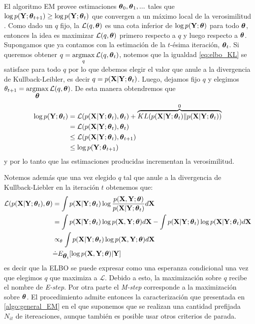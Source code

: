 El algoritmo EM provee estimaciones $\mbox{\boldmath$ \theta $}_0, \mbox{\boldmath$ \theta $}_1, ...$ tales que $\log p(\mathbf{Y}; \mbox{\boldmath$ \theta $}_{t+1}) \geq \log p(\mathbf{Y}; \mbox{\boldmath$ \theta $}_t)$ que convergen a un máximo local de la verosimilitud \citep{Wu1983}. Como dado un $q$ fijo, la $\mathcal{L}(q,\mbox{\boldmath$ \theta $})$ es una cota inferior de $\log p(\mathbf{Y}; \mbox{\boldmath$ \theta $})$ para todo $\mbox{\boldmath$ \theta $}$, entonces la idea es maximizar $\mathcal{L}(q,\mbox{\boldmath$ \theta $})$ primero respecto a $q$ y luego respecto a $\mbox{\boldmath$ \theta $}$. Supongamos que ya contamos con la estimación de la $t$-ésima iteración, $\mbox{\boldmath$ \theta $}_t$. Si queremos obtener $q = \operatorname*{argmax}\limits_{q}\mathcal{L}(q,\mbox{\boldmath$ \theta $}_t)$, notemos que la igualdad \ref{eq:elbo_KL} se satisface para todo $q$ por lo que debemos elegir el valor que anule a la divergencia de Kullback-Leibler, es decir $q = p(\mathbf{X} | \mathbf{Y}; \mbox{\boldmath$ \theta $}_t)$. Luego, dejamos fijo $q$ y elegimos $\theta_{t+1} = \operatorname*{argmax}\limits_{\mbox{\boldmath$ \theta $}} \mathcal{L}(q,\mbox{\boldmath$ \theta $})$. De esta manera obtendremos que 
\begin{align*}
    \log p(\mathbf{Y}; \mbox{\boldmath$ \theta $}_t) &= \mathcal{L}(p(\mathbf{X} | \mathbf{Y}; \mbox{\boldmath$ \theta $}_t), \mbox{\boldmath$ \theta $}_t) + \overbrace{KL(p(\mathbf{X} | \mathbf{Y}; \mbox{\boldmath$ \theta $}_t) \rVert p(\mathbf{X} | \mathbf{Y}; \mbox{\boldmath$ \theta $}_t))}^{0} \\
    &= \mathcal{L}(p(\mathbf{X} | \mathbf{Y}; \mbox{\boldmath$ \theta $}_t), \mbox{\boldmath$ \theta $}_t) \\
    &\leq \mathcal{L}(p(\mathbf{X} | \mathbf{Y}; \mbox{\boldmath$ \theta $}_t), \mbox{\boldmath$ \theta $}_{t+1}) \\
    &\leq \log p(\mathbf{Y}; \mbox{\boldmath$ \theta $}_{t+1})
\end{align*}
y por lo tanto que las estimaciones producidas incrementan la verosimilitud.

Notemos además que una vez elegido $q$ tal que anule a la divergencia de Kullback-Liebler en la iteración $t$ obtenemos que:
\begin{align*}
    \mathcal{L}(p(\mathbf{X} | \mathbf{Y}; \mbox{\boldmath$ \theta $}_t), \mbox{\boldmath$ \theta $}) &= \int p(\mathbf{X} | \mathbf{Y}; \mbox{\boldmath$ \theta $}_t) \log \frac{p(\mathbf{X}, \mathbf{Y}; \mbox{\boldmath$ \theta $})}{p(\mathbf{X} | \mathbf{Y}; \mbox{\boldmath$ \theta $}_t)} d\mathbf{X} \\
    &= \int p(\mathbf{X} | \mathbf{Y}; \mbox{\boldmath$ \theta $}_t) \log p(\mathbf{X}, \mathbf{Y}; \mbox{\boldmath$ \theta $}) d\mathbf{X} - \int p(\mathbf{X} | \mathbf{Y}; \mbox{\boldmath$ \theta $}_t) \log p(\mathbf{X} | \mathbf{Y}; \mbox{\boldmath$ \theta $}_t) d\mathbf{X} \\
    &\propto_{\theta} \int p(\mathbf{X} | \mathbf{Y}; \mbox{\boldmath$ \theta $}_t) \log p(\mathbf{X}, \mathbf{Y}; \mbox{\boldmath$ \theta $}) d\mathbf{X} \\
    &\dot{=} E_{\mbox{\boldmath$ \theta $}_t}[\log p(\mathbf{X}, \mathbf{Y}; \mbox{\boldmath$ \theta $})| \mathbf{Y}]
\end{align*}
es decir que la ELBO se puede expresar como una esperanza condicional una vez que elegimos $q$ que maximiza a $\mathcal{L}$. Debido a esto, la maximización sobre $q$ recibe el nombre de \textit{E-step}. Por otra parte el \textit{M-step} corresponde a la maximización sobre $\mbox{\boldmath$ \theta $}$. El procedimiento admite entonces la caracterización que presentada en \ref{algo:general_EM} en el que suponemos que se realizan una cantidad prefijada $N_{it}$ de itereaciones, aunque también es posible usar otros criterios de parada.

